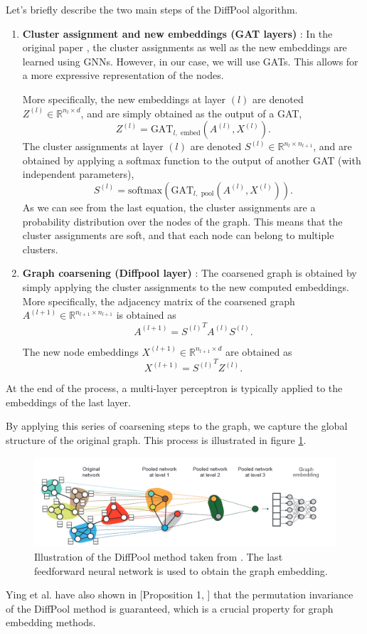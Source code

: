 \documentclass[switch, 11pt]{article}
\newcommand{\R}{\mathbb{R}}
\begin{document}
\begin{multicols}{2}
    Let's briefly describe the two main steps of the DiffPool algorithm.
    \begin{enumerate}
        \item \textbf{Cluster assignment and new embeddings (GAT layers)} : In the original paper \cite{ying-2018}, the cluster assignments as well as the new embeddings are learned using GNNs. However, in our case, we will use GATs. This allows for a more expressive representation of the nodes.

              More specifically, the new embeddings at layer $(l)$ are denoted $Z^{(l)}\in\R^{n_l\times d}$, and are simply obtained as the output of a GAT,
              $$Z^{(l)} = \text{GAT}_{l, \text{ embed}}\left(A^{(l)},X^{(l)}\right).$$
              \noindent The cluster assignments at layer $(l)$ are denoted $S^{(l)}\in\R^{n_l\times n_{l+1}}$, and are obtained by applying a softmax function to the output of another GAT (with independent parameters),
              $$S^{(l)} = \text{softmax}\left(\text{GAT}_{l, \text{ pool}}\left(A^{(l)},X^{(l)}\right)\right).$$
              \noindent As we can see from the last equation, the cluster assignments are a probability distribution over the nodes of the graph. This means that the cluster assignments are soft, and that each node can belong to multiple clusters.
        \item \textbf{Graph coarsening (Diffpool layer)} : The coarsened graph is obtained by simply applying the cluster assignments to the new computed embeddings. More specifically, the adjacency matrix of the coarsened graph $A^{(l+1)} \in \R^{n_{l+1}\times n_{l+1}}$ is obtained as
              $$A^{(l+1)} = {S^{(l)}}^TA^{(l)}S^{(l)}.$$

              The new node embeddings $X^{(l+1)}\in\R^{n_{l+1}\times d}$ are obtained as
              $$X^{(l+1)} = {S^{(l)}}^T Z^{(l)}.$$
    \end{enumerate}
    At the end of the process, a multi-layer perceptron is typically applied to the embeddings of the last layer.

    By applying this series of coarsening steps to the graph, we capture the global structure of the original graph. This process is illustrated in figure \ref{fig:diffpool}.
    \begin{figure}[H]
        \centering
        \includegraphics[width=\columnwidth]{figures/diffpool.jpg}
        \caption{Illustration of the DiffPool method taken from \cite{ying-2018}. The last feedforward neural network is used to obtain the graph embedding.}
        \label{fig:diffpool}
    \end{figure}
    Ying et al. have also shown in [Proposition 1, \cite{ying-2018}] that the permutation invariance of the DiffPool method is guaranteed, which is a crucial property for graph embedding methods.

\end{multicols}
\end{document}
